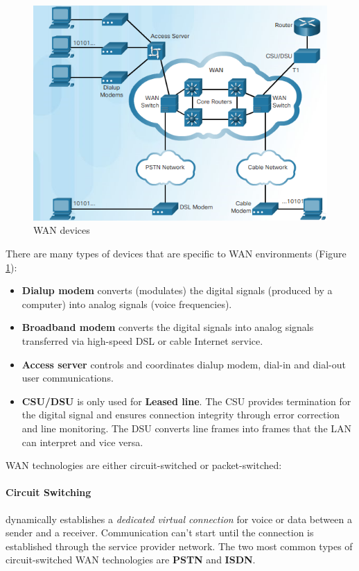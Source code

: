 \begin{figure}[hbtp]
\caption{WAN devices}\label{Device}
\centering
\includegraphics[scale=1]{pictures/Device.PNG}
\end{figure}

There are many types of devices that are specific to WAN environments (Figure \ref{Device}):

\begin{itemize}
\item \textbf{Dialup modem} converts (modulates) the digital signals (produced by a computer) into analog signals (voice frequencies).

\item \textbf{Broadband modem} converts the digital signals into analog signals transferred via high-speed DSL or cable Internet service.

\item \textbf{Access server} controls and coordinates dialup modem, dial-in and dial-out user communications.


\item \textbf{CSU/DSU} is only used for \textbf{Leased line}. The CSU provides termination for the digital signal and ensures connection integrity through error correction and line monitoring. The DSU converts line frames into frames that the LAN can interpret and vice versa.
\end{itemize}

WAN technologies are either circuit-switched or packet-switched:

\paragraph{Circuit Switching} dynamically establishes a \emph{dedicated virtual connection} for voice or data between a sender and a receiver. Communication can't start until the connection is established through the service provider network. The two most common types of circuit-switched WAN technologies are \textbf{PSTN} and \textbf{ISDN}.

